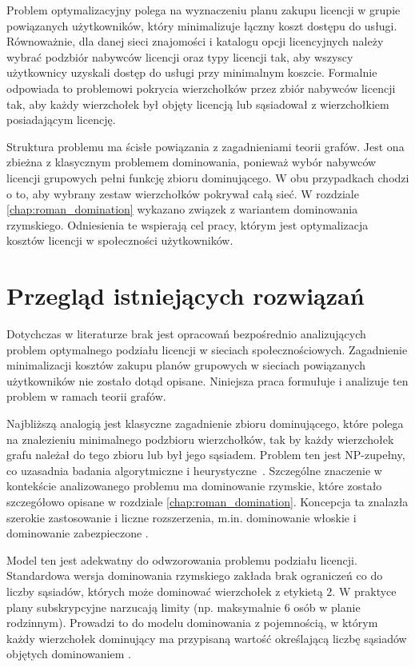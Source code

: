 Problem optymalizacyjny polega na wyznaczeniu planu zakupu licencji w grupie powiązanych użytkowników, który minimalizuje łączny koszt dostępu do usługi. Równoważnie, dla danej sieci znajomości i katalogu opcji licencyjnych należy wybrać podzbiór nabywców licencji oraz typy licencji tak, aby wszyscy użytkownicy uzyskali dostęp do usługi przy minimalnym koszcie. Formalnie odpowiada to problemowi pokrycia wierzchołków przez zbiór nabywców licencji tak, aby każdy wierzchołek był objęty licencją lub sąsiadował z wierzchołkiem posiadającym licencję.

Struktura problemu ma ścisłe powiązania z zagadnieniami teorii grafów. Jest ona zbieżna z klasycznym problemem dominowania, ponieważ wybór nabywców licencji grupowych pełni funkcję zbioru dominującego. W obu przypadkach chodzi o to, aby wybrany zestaw wierzchołków pokrywał całą sieć. W rozdziale \ref{chap:roman_domination} wykazano związek z wariantem dominowania rzymskiego. Odniesienia te wspierają cel pracy, którym jest optymalizacja kosztów licencji w społeczności użytkowników.

\section{Przegląd istniejących rozwiązań}

Dotychczas w literaturze brak jest opracowań bezpośrednio analizujących problem optymalnego podziału licencji w sieciach społecznościowych. Zagadnienie minimalizacji kosztów zakupu planów grupowych w sieciach powiązanych użytkowników nie zostało dotąd opisane. Niniejsza praca formułuje i analizuje ten problem w ramach teorii grafów.

Najbliższą analogią jest klasyczne zagadnienie zbioru dominującego, które polega na znalezieniu minimalnego podzbioru wierzchołków, tak by każdy wierzchołek grafu należał do tego zbioru lub był jego sąsiadem. Problem ten jest NP-zupełny, co uzasadnia badania algorytmiczne i heurystyczne~\cite{garey1979}. Szczególne znaczenie w kontekście analizowanego problemu ma dominowanie rzymskie, które zostało szczegółowo opisane w rozdziale \ref{chap:roman_domination}. Koncepcja ta znalazła szerokie zastosowanie i liczne rozszerzenia, m.in. dominowanie włoskie i dominowanie zabezpieczone \cite{Roman2DominationSurvey}.

Model ten jest adekwatny do odwzorowania problemu podziału licencji. Standardowa wersja dominowania rzymskiego zakłada brak ograniczeń co do liczby sąsiadów, których może dominować wierzchołek z etykietą $2$. W praktyce plany subskrypcyjne narzucają limity (np. maksymalnie $6$ osób w planie rodzinnym). Prowadzi to do modelu dominowania z pojemnością, w którym każdy wierzchołek dominujący ma przypisaną wartość określającą liczbę sąsiadów objętych dominowaniem \cite{CapDom}.

